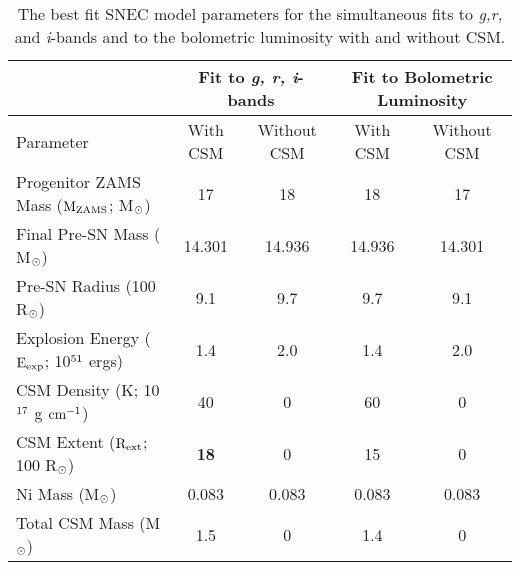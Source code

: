 \documentclass[a4paper,fleqn,usenatbib]{mnras}
\newcommand{\msunperiod}{M$\rm{_{\odot}}$}
\begin{document}
\begin{table*}
\centering
\caption{The best fit SNEC model parameters for the simultaneous fits to {\it g,r,} and {\it i}-bands and to the bolometric luminosity with and without CSM.}
\label{tab:BestModel}
\begin{tabular}{l|c|c|c|c|}
\hline
                                                                                            &\multicolumn{2}{|c|}{Fit to {\it g, r, i}-bands} &\multicolumn{2}{|c|}{Fit to Bolometric Luminosity}\\
\hline
Parameter                                                                         & With CSM            & Without CSM     & With CSM & Without CSM\\
\hline
Progenitor ZAMS Mass ($\rm{M_{ZAMS}}$; \msunperiod) &   17                    &     18                    &   18            &17\\
Final Pre-SN Mass ( \msunperiod)                          &   14.301             &      14.936            &     14.936    &14.301\\
Pre-SN Radius (100 R$\rm{_{\odot}}$)                   &  9.1                    &      9.7                  &       9.7       &9.1\\
Explosion Energy ($\rm{E_{exp}}$; 10$\rm{^{51}}$ ergs)    &    1.4                 &     2.0                 &     1.4             &2.0 \\
CSM Density (K; 10$\rm{^{17}}$ g $\rm{cm^{-1}}$)             &     40                  &     0                    &       60           &0 \\
CSM Extent ($\rm{R_{ext}}$; 100 R$\rm{_{\odot}}$)            &     \textbf{18}              &     0                     &      15       &0 \\
Ni Mass (\msunperiod)                                                         &     0.083               &    0.083              &    0.083       &0.083\\
Total CSM Mass (\msunperiod)                                            & 1.5                      &          0               &    1.4            &   0 \\
\hline
\end{tabular}
\end{table*}
\end{document}
